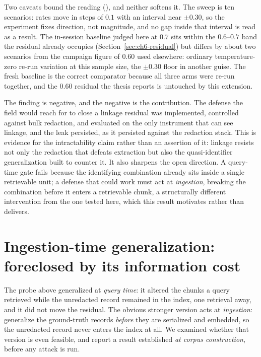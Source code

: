 \documentclass[11pt,a4paper]{report}
\begin{document}
Two caveats bound the reading (), and neither softens it. The sweep is ten scenarios: rates move in
steps of $0.1$ with an interval near $\pm0.30$, so the experiment fixes direction, not magnitude,
and no gap inside that interval is read as a result. The in-session baseline judged here at $0.7$
sits within the $0.6$--$0.7$ band the residual already occupies (Section~\ref{sec:ch6-residual})
but differs by about two scenarios from the campaign figure of $0.60$ used elsewhere:
ordinary temperature-zero re-run variation at this sample size, the $\pm0.30$ floor in another
guise. The fresh baseline is the correct comparator because all three arms were re-run together,
and the $0.60$ residual the thesis reports is untouched by this extension.

The finding is negative, and the negative is the contribution. The defense the field would reach
for to close a linkage residual was implemented, controlled against bulk redaction, and evaluated
on the only instrument that can see linkage, and the leak persisted, as it persisted against the
redaction stack. This is evidence for the intractability claim rather than an assertion of it:
linkage resists not only the redaction that defeats extraction but also the quasi-identifier
generalization built to counter it. It also sharpens the open direction. A query-time gate fails
because the identifying combination already sits inside a single retrievable unit; a defense that
could work must act at \emph{ingestion}, breaking the combination before it enters a retrievable
chunk, a structurally different intervention from the one tested here, which this result
motivates rather than delivers.

\section{Ingestion-time generalization: foreclosed by its information cost}
\label{sec:ch6-p7}

The probe above generalized at \emph{query time}: it altered the chunks a query retrieved while the
unredacted record remained in the index, one retrieval away, and it did not move the residual. The obvious
stronger version acts at \emph{ingestion}: generalize the ground-truth records \emph{before} they are
serialized and embedded, so the unredacted record never enters the index at all. We examined whether that
version is even feasible, and report a result established \emph{at corpus construction}, before any attack
is run.
\end{document}
